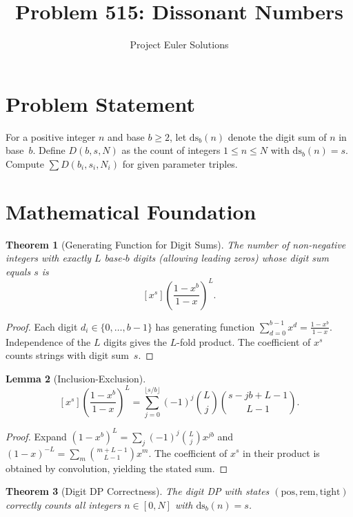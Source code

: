 \documentclass[11pt]{article}
\title{Problem 515: Dissonant Numbers}
\author{Project Euler Solutions}
\date{}
\newtheorem{theorem}{Theorem}
\newtheorem{lemma}[theorem]{Lemma}
\begin{document}
\maketitle

\section{Problem Statement}

For a positive integer $n$ and base $b \geq 2$, let $\mathrm{ds}_b(n)$ denote the digit sum of $n$ in base~$b$. Define $D(b, s, N)$ as the count of integers $1 \leq n \leq N$ with $\mathrm{ds}_b(n) = s$. Compute $\sum D(b_i, s_i, N_i)$ for given parameter triples.

\section{Mathematical Foundation}

\begin{theorem}[Generating Function for Digit Sums]
The number of non-negative integers with exactly $L$ base-$b$ digits (allowing leading zeros) whose digit sum equals $s$ is
\[
[x^s]\left(\frac{1 - x^b}{1 - x}\right)^L.
\]
\end{theorem}

\begin{proof}
Each digit $d_i \in \{0, \ldots, b-1\}$ has generating function $\sum_{d=0}^{b-1}x^d = \frac{1 - x^b}{1 - x}$. Independence of the $L$ digits gives the $L$-fold product. The coefficient of $x^s$ counts strings with digit sum~$s$.
\end{proof}

\begin{lemma}[Inclusion-Exclusion]
\[
[x^s]\left(\frac{1-x^b}{1-x}\right)^L = \sum_{j=0}^{\lfloor s/b \rfloor}(-1)^j \binom{L}{j}\binom{s - jb + L - 1}{L - 1}.
\]
\end{lemma}

\begin{proof}
Expand $(1-x^b)^L = \sum_j (-1)^j \binom{L}{j}x^{jb}$ and $(1-x)^{-L} = \sum_m \binom{m+L-1}{L-1}x^m$. The coefficient of $x^s$ in their product is obtained by convolution, yielding the stated sum.
\end{proof}

\begin{theorem}[Digit DP Correctness]
The digit DP with states $(\mathrm{pos}, \mathrm{rem}, \mathrm{tight})$ correctly counts all integers $n \in [0, N]$ with $\mathrm{ds}_b(n) = s$.
\end{theorem}
\end{document}
